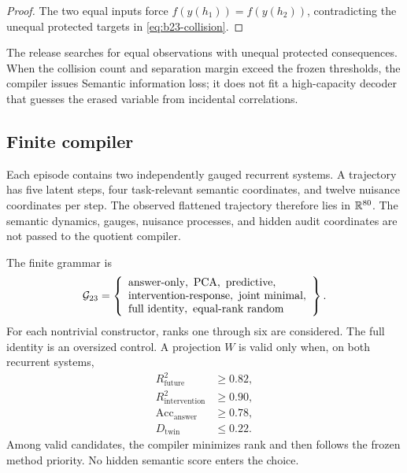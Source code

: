 \begin{proof}
The two equal inputs force $f(y(h_1))=f(y(h_2))$, contradicting the unequal protected targets in \cref{eq:b23-collision}.
\end{proof}

The release searches for equal observations with unequal protected consequences.  When the collision count and separation margin exceed the frozen thresholds, the compiler issues Semantic information loss; it does not fit a high-capacity decoder that guesses the erased variable from incidental correlations.

\subsection{Finite compiler}

Each episode contains two independently gauged recurrent systems.  A trajectory has five latent steps, four task-relevant semantic coordinates, and twelve nuisance coordinates per step.  The observed flattened trajectory therefore lies in $\mathbb R^{80}$.  The semantic dynamics, gauges, nuisance processes, and hidden audit coordinates are not passed to the quotient compiler.

The finite grammar is
\begin{equation}
\mathcal G_{23}
=
\left\{
\begin{array}{l}
\text{answer-only},\ \text{PCA},\ \text{predictive},\ \\
\text{intervention-response},\ \text{joint minimal},\\
\text{full identity},\ \text{equal-rank random}
\end{array}
\right\}.
\label{eq:b23-grammar}
\end{equation}
For each nontrivial constructor, ranks one through six are considered.  The full identity is an oversized control.  A projection $W$ is valid only when, on both recurrent systems,
\begin{equation}
\begin{aligned}
R^2_{\mathrm{future}}&\geq0.82,\\
R^2_{\mathrm{intervention}}&\geq0.90,\\
\operatorname{Acc}_{\mathrm{answer}}&\geq0.78,\\
D_{\mathrm{twin}}&\leq0.22.
\end{aligned}
\label{eq:b23-visible-gates}
\end{equation}
Among valid candidates, the compiler minimizes rank and then follows the frozen method priority.  No hidden semantic score enters the choice.

